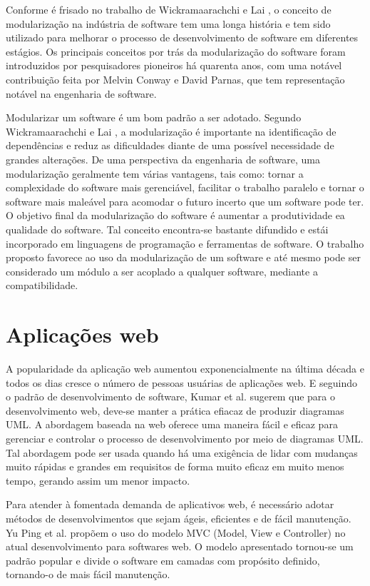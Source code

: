 Conforme é frisado no trabalho de Wickramaarachchi e Lai \citep{7062705}, o conceito de modularização na indústria de software tem uma longa história e tem sido utilizado para melhorar o processo de desenvolvimento de software em diferentes estágios. Os principais conceitos por trás da modularização do software foram introduzidos por pesquisadores pioneiros há quarenta anos, com uma notável contribuição feita por Melvin Conway e David Parnas, que tem representação notável na engenharia de software.


Modularizar um software é um bom padrão a ser adotado. Segundo Wickramaarachchi e Lai \citep{7062705}, a modularização é importante na identificação de dependências e reduz as dificuldades diante de uma possível necessidade de grandes alterações. De uma perspectiva da engenharia de software, uma modularização geralmente tem várias vantagens, tais como: tornar a complexidade do software mais gerenciável, facilitar o trabalho paralelo e tornar o software mais maleável para acomodar o futuro incerto que um software pode ter. O objetivo final da modularização do software é aumentar a produtividade ea qualidade do software. Tal conceito encontra-se bastante difundido e estái incorporado em linguagens de programação e ferramentas de software. O trabalho proposto favorece ao uso da modularização de um software e até mesmo pode ser considerado um módulo a ser acoplado a qualquer software, mediante a compatibilidade.


\section{Aplicações web}\label{sec:apps_web}


A popularidade da aplicação web aumentou exponencialmente na última década e todos os dias cresce o número de pessoas usuárias de aplicações web. E seguindo o padrão de desenvolvimento de software, Kumar et al. \citep{7813710} sugerem que para o desenvolvimento web, deve-se manter a prática efiacaz de produzir diagramas UML. A abordagem baseada na web oferece uma maneira fácil e eficaz para gerenciar e controlar o processo de desenvolvimento por meio de diagramas UML. Tal abordagem pode ser usada quando há uma exigência de lidar com mudanças muito rápidas e grandes em requisitos de forma muito eficaz em muito menos tempo, gerando assim um menor impacto. 


Para atender à fomentada demanda de aplicativos web, é necessário adotar métodos de desenvolvimentos que sejam ágeis, eficientes e de fácil manutenção. Yu Ping et al. \cite{1372143} propõem o uso do modelo MVC (Model, View e Controller) no atual desenvolvimento para softwares web. O modelo apresentado tornou-se um padrão popular e divide o software em camadas com propósito definido, tornando-o de mais fácil manutenção.


